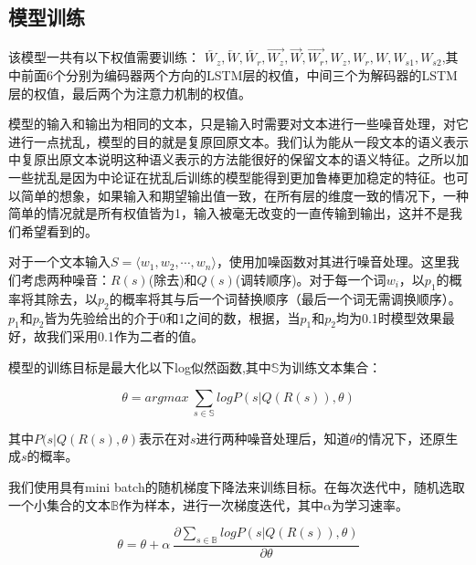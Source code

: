 \documentclass[UTF8,11pt,a4paper,nofonts]{ctexart}
\begin{document}



\subsection{模型训练}

该模型一共有以下权值需要训练：
$\overleftarrow{W_z}, \overleftarrow{W}, \overleftarrow{W_r}, \overrightarrow{W_z}, \overrightarrow{W}, \overrightarrow{W_r},W_z, W_r, W, W_{s1}, W_{s2}$,其中前面6个分别为编码器两个方向的LSTM层的权值，中间三个为解码器的LSTM层的权值，最后两个为注意力机制的权值。

模型的输入和输出为相同的文本，只是输入时需要对文本进行一些噪音处理，对它进行一点扰乱，模型的目的就是复原回原文本。我们认为能从一段文本的语义表示中复原出原文本说明这种语义表示的方法能很好的保留文本的语义特征。之所以加一些扰乱是因为\cite{Vincent2008ExtractingAC}中论证在扰乱后训练的模型能得到更加鲁棒更加稳定的特征。也可以简单的想象，如果输入和期望输出值一致，在所有层的维度一致的情况下，一种简单的情况就是所有权值皆为1，输入被毫无改变的一直传输到输出，这并不是我们希望看到的。

对于一个文本输入$S=\langle w_1,w_2,\cdots,w_n \rangle$，使用加噪函数对其进行噪音处理。这里我们考虑两种噪音：$R(s)$(除去)和$Q(s)$(调转顺序)。对于每一个词$w_i$，以$p_1$的概率将其除去，以$p_2$的概率将其与后一个词替换顺序（最后一个词无需调换顺序）。$p_1$和$p_2$皆为先验给出的介于0和1之间的数，根据\cite{lin2017structured}，当$p_1$和$p_2$均为0.1时模型效果最好，故我们采用0.1作为二者的值。

模型的训练目标是最大化以下log似然函数,其中$\mathbb{S}$为训练文本集合：

% 
\begin{equation}
\theta = argmax ~\sum_{s\in \mathbb{S}} log P(s|Q(R(s)), \theta)
\end{equation}

其中$P(s|Q(R(s),\theta)$表示在对$s$进行两种噪音处理后，知道$\theta$的情况下，还原生成$s$的概率。

我们使用具有mini batch的随机梯度下降法来训练目标。在每次迭代中，随机选取一个小集合的文本$\mathbb{B}$作为样本，进行一次梯度迭代，其中$\alpha$为学习速率。

\begin{equation}
\theta = \theta + \alpha ~ \frac{\partial \sum_{s\in \mathbb{B}} log P(s|Q(R(s)), \theta)}{\partial \theta}
\end{equation}
\end{document}
